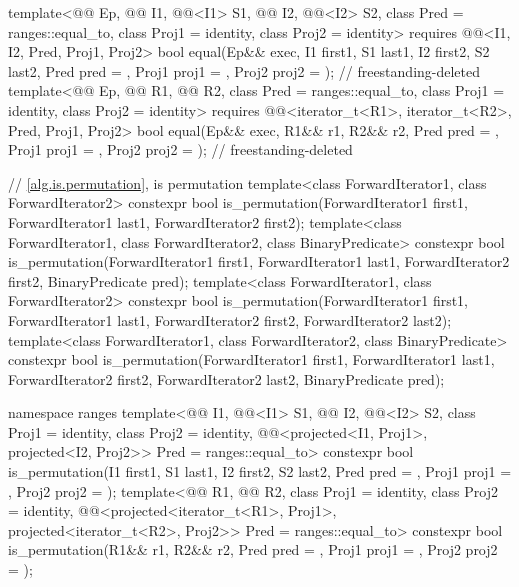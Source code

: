 \begin{codeblock}
{{    template<@@ Ep, @@ I1, @@<I1> S1,
             @@ I2, @@<I2> S2,
             class Pred = ranges::equal_to, class Proj1 = identity, class Proj2 = identity>
      requires @@<I1, I2, Pred, Proj1, Proj2>
      bool equal(Ep&& exec, I1 first1, S1 last1, I2 first2, S2 last2,
                 Pred pred = {}, Proj1 proj1 = {}, Proj2 proj2 = {});       // freestanding-deleted
    template<@@ Ep, @@ R1, @@ R2,
             class Pred = ranges::equal_to, class Proj1 = identity, class Proj2 = identity>
      requires @@<iterator_t<R1>, iterator_t<R2>, Pred, Proj1, Proj2>
      bool equal(Ep&& exec, R1&& r1, R2&& r2,
                 Pred pred = {}, Proj1 proj1 = {}, Proj2 proj2 = {});       // freestanding-deleted
  }

  // \ref{alg.is.permutation}, is permutation
  template<class ForwardIterator1, class ForwardIterator2>
    constexpr bool is_permutation(ForwardIterator1 first1, ForwardIterator1 last1,
                                  ForwardIterator2 first2);
  template<class ForwardIterator1, class ForwardIterator2, class BinaryPredicate>
    constexpr bool is_permutation(ForwardIterator1 first1, ForwardIterator1 last1,
                                  ForwardIterator2 first2, BinaryPredicate pred);
  template<class ForwardIterator1, class ForwardIterator2>
    constexpr bool is_permutation(ForwardIterator1 first1, ForwardIterator1 last1,
                                  ForwardIterator2 first2, ForwardIterator2 last2);
  template<class ForwardIterator1, class ForwardIterator2, class BinaryPredicate>
    constexpr bool is_permutation(ForwardIterator1 first1, ForwardIterator1 last1,
                                  ForwardIterator2 first2, ForwardIterator2 last2,
                                  BinaryPredicate pred);

  namespace ranges {
    template<@@ I1, @@<I1> S1, @@ I2,
             @@<I2> S2, class Proj1 = identity, class Proj2 = identity,
             @@<projected<I1, Proj1>,
                                           projected<I2, Proj2>> Pred = ranges::equal_to>
      constexpr bool is_permutation(I1 first1, S1 last1, I2 first2, S2 last2,
                                    Pred pred = {},
                                    Proj1 proj1 = {}, Proj2 proj2 = {});
    template<@@ R1, @@ R2,
             class Proj1 = identity, class Proj2 = identity,
             @@<projected<iterator_t<R1>, Proj1>,
                                           projected<iterator_t<R2>, Proj2>>
                                           Pred = ranges::equal_to>
      constexpr bool is_permutation(R1&& r1, R2&& r2, Pred pred = {},
                                    Proj1 proj1 = {}, Proj2 proj2 = {});
  }

}
\end{codeblock}
